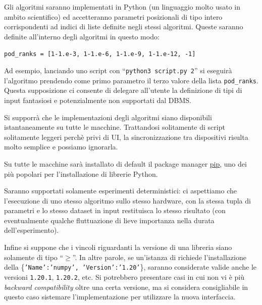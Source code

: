 \documentclass{article}
\begin{document}
Gli algoritmi saranno implementati in Python (un linguaggio molto usato in ambito scientifico) ed accetteranno parametri posizionali di tipo intero corrispondenti ad indici di liste definite negli stessi algoritmi. Queste saranno definite all'interno degli algoritmi in questo modo:

\verb|pod_ranks = [1-1.e-3, 1-1.e-6, 1-1.e-9, 1-1.e-12, -1]|

Ad esempio, lanciando uno script con ``\texttt{python3 script.py 2}'' si eseguirà l'algoritmo prendendo come primo parametro il terzo valore della lista \texttt{pod\_ranks}. Questa supposizione ci consente di delegare all'utente la definizione di tipi di input fantasiosi e potenzialmente non supportati dal DBMS.

Si supporrà che le implementazioni degli algoritmi siano disponibili istantaneamente su tutte le macchine. Trattandosi solitamente di script solitamente leggeri perchè privi di UI, la sincronizzazione tra dispositivi risulta molto semplice e possiamo ignorarla.

Su tutte le macchine sarà installato di default il package manager \href{https://pypi.org/project/pip/}{pip}, uno dei più popolari per l'installazione di librerie Python.

Saranno supportati solamente esperimenti deterministici: ci aspettiamo che l'esecuzione di uno stesso algoritmo sullo stesso hardware, con la stessa tupla di parametri e lo stesso dataset in input restituisca lo stesso risultato (con eventualmente qualche fluttuazione di lieve importanza nella durata dell'esperimento).

Infine si suppone che i vincoli riguardanti la versione di una libreria siano solamente di tipo ``$\geq$''. In altre parole, se un'istanza di  richiede l'installazione della  \{\texttt{'Name':'numpy', 'Version':'1.20'}\}, saranno considerate valide anche le versioni \texttt{1.20.1}, \texttt{1.20.2}, etc. Si potrebbero presentare casi in cui non vi è più \emph{backward compatibility} oltre una certa versione, ma si considera consigliabile in questo caso sistemare l'implementazione per utilizzare la nuova interfaccia.
\end{document}
